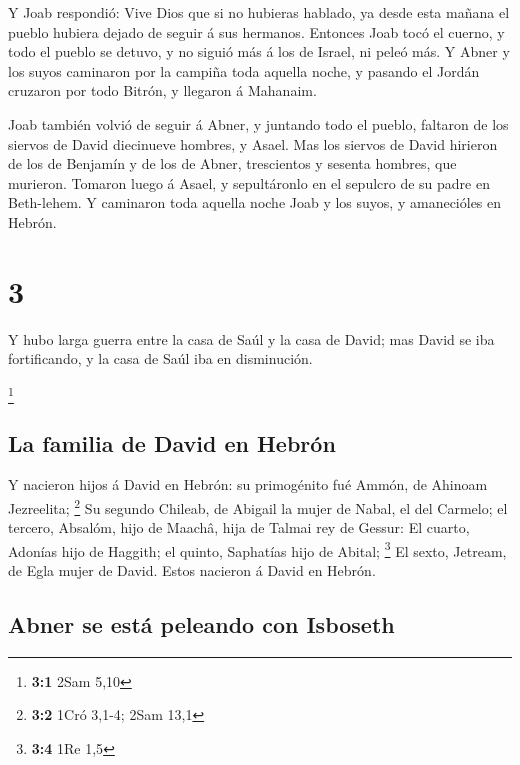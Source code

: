  Y Joab respondió: Vive Dios que si no hubieras hablado,
ya desde esta mañana el pueblo hubiera dejado de seguir á sus hermanos.
 Entonces Joab tocó el cuerno, y todo el pueblo se
detuvo, y no siguió más á los de Israel, ni peleó más.  Y
Abner y los suyos caminaron por la campiña toda aquella noche, y pasando
el Jordán cruzaron por todo Bitrón, y llegaron á Mahanaim.

 Joab también volvió de seguir á Abner, y juntando todo
el pueblo, faltaron de los siervos de David diecinueve hombres, y Asael.
 Mas los siervos de David hirieron de los de Benjamín y
de los de Abner, trescientos y sesenta hombres, que murieron. Tomaron
luego á Asael, y sepultáronlo en el sepulcro de su padre en Beth-lehem.
 Y caminaron toda aquella noche Joab y los suyos, y
amanecióles en Hebrón.

\hypertarget{section-2}{%
\section{3}\label{section-2}}

 Y hubo larga guerra entre la casa de Saúl y la casa de
David; mas David se iba fortificando, y la casa de Saúl iba en
disminución.

\footnote{\textbf{3:1} 2Sam 5,10}

\hypertarget{la-familia-de-david-en-hebruxf3n}{%
\subsection{La familia de David en
Hebrón}\label{la-familia-de-david-en-hebruxf3n}}

 Y nacieron hijos á David en Hebrón: su primogénito fué
Ammón, de Ahinoam Jezreelita; \footnote{\textbf{3:2} 1Cró 3,1-4; 2Sam
  13,1}  Su segundo Chileab, de Abigail la mujer de Nabal,
el del Carmelo; el tercero, Absalóm, hijo de Maachâ, hija de Talmai rey
de Gessur:  El cuarto, Adonías hijo de Haggith; el quinto,
Saphatías hijo de Abital; \footnote{\textbf{3:4} 1Re 1,5} 
El sexto, Jetream, de Egla mujer de David. Estos nacieron á David en
Hebrón.

\hypertarget{abner-se-estuxe1-peleando-con-isboseth}{%
\subsection{Abner se está peleando con
Isboseth}\label{abner-se-estuxe1-peleando-con-isboseth}}

